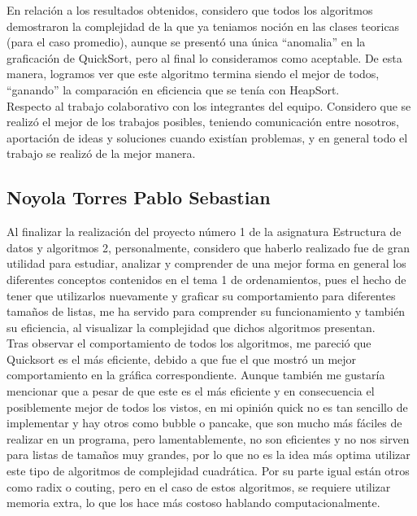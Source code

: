 \documentclass[a4paper,12pt]{article}
\begin{document}
En relación a los resultados obtenidos, considero que todos los algoritmos demostraron la complejidad de la que ya teniamos noción en las clases teoricas (para el caso promedio), aunque se presentó una única ``anomalia'' en la graficación de QuickSort, pero al final lo consideramos como aceptable. De esta manera, logramos ver que este algoritmo termina siendo el mejor de todos, ``ganando'' la comparación en eficiencia que se tenía con HeapSort.\\

Respecto al trabajo colaborativo con los integrantes del equipo. Considero que se realizó el mejor de los trabajos posibles, teniendo comunicación entre nosotros, aportación de ideas y soluciones cuando existían problemas, y en general todo el trabajo se realizó de la mejor manera.


\subsection{Noyola Torres Pablo Sebastian}

Al finalizar la realización del proyecto número 1 de la asignatura Estructura de datos y algoritmos 2, personalmente, considero que haberlo realizado fue de gran utilidad para estudiar, analizar y comprender de una mejor forma en general los diferentes conceptos contenidos en el tema 1 de ordenamientos, pues el hecho de tener que utilizarlos nuevamente y graficar su comportamiento para diferentes tamaños de listas, me ha servido para comprender su funcionamiento y también su eficiencia, al visualizar la complejidad que dichos algoritmos presentan.\\

Tras observar el comportamiento de todos los algoritmos, me pareció que Quicksort es el más eficiente, debido a que fue el que mostró un mejor comportamiento en la gráfica correspondiente. Aunque también me gustaría mencionar que a pesar de que este es el más eficiente y en consecuencia el posiblemente mejor de todos los vistos, en mi opinión quick no es tan sencillo de implementar y hay otros como bubble o pancake, que son mucho más fáciles de realizar en un programa, pero lamentablemente, no son eficientes y no nos sirven para listas de tamaños muy grandes, por lo que no es la idea más optima utilizar este tipo de algoritmos de complejidad cuadrática. Por su parte igual están otros como radix o couting, pero en el caso de estos algoritmos, se requiere utilizar memoria extra, lo que los hace más costoso hablando computacionalmente.\\
\end{document}
